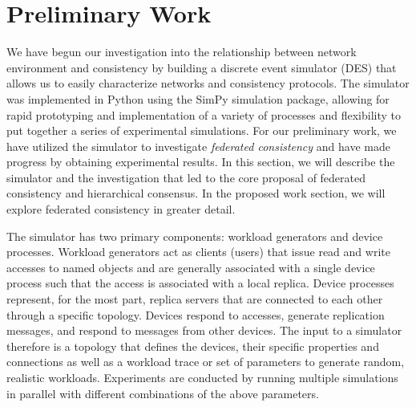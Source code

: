 \documentclass{article}
\begin{document}
\section{Preliminary Work}
\label{sec:preliminary_work}

We have begun our investigation into the relationship between network environment and consistency by building a discrete event simulator (DES) that allows us to easily characterize networks and consistency protocols. The simulator was implemented in Python using the SimPy simulation package, allowing for rapid prototyping and implementation of a variety of processes and flexibility to put together a series of experimental simulations. For our preliminary work, we have utilized the simulator to investigate \textit{federated consistency} and have made progress by obtaining experimental results. In this section, we will describe the simulator and the investigation that led to the core proposal of federated consistency and hierarchical consensus. In the proposed work section, we will explore federated consistency in greater detail.

The simulator has two primary components: workload generators and device processes. Workload generators act as clients (users) that issue read and write accesses to named objects and are generally associated with a single device process such that the access is associated with a local replica. Device processes represent, for the most part, replica servers that are connected to each other through a specific topology. Devices respond to accesses, generate replication messages, and respond to messages from other devices. The input to a simulator therefore is a topology that defines the devices, their specific properties and connections as well as a workload trace or set of parameters to generate random, realistic workloads. Experiments are conducted by running multiple simulations in parallel with different combinations of the above parameters.
\end{document}
